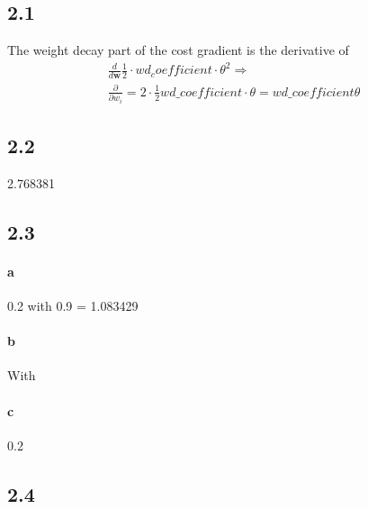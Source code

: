 \documentclass{article}
\begin{document}
\subsection*{2.1}

The weight decay part of the cost gradient is the derivative of
\begin{align}
  \frac{d}{d\mathbf{w}}\frac{1}{2}\cdot wd_coefficient \cdot \theta^2 \Rightarrow \\
  \nonumber \frac{\partial}{\partial w_i} = 2 \cdot \frac{1}{2} wd\_coefficient \cdot \theta = wd\_coefficient \theta
\end{align}

\subsection*{2.2}

2.768381

\subsection*{2.3}

\paragraph{a}

0.2 with 0.9 = 1.083429

\paragraph{b}

With

\paragraph{c}

0.2


\subsection*{2.4}
\end{document}

